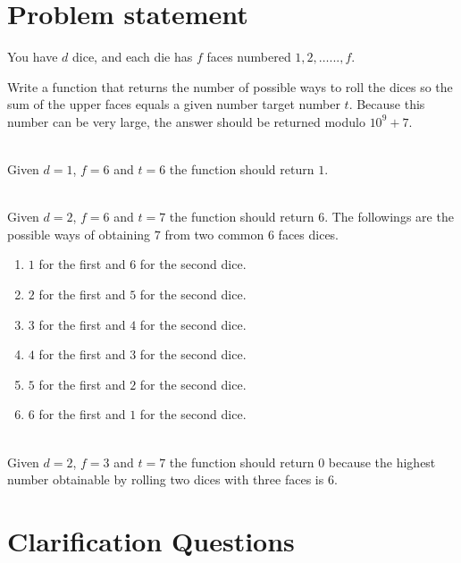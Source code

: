\section{Problem statement}
\begin{exercise}
You have $d$ dice, and each die has $f$ faces numbered $1, 2, \ldots..., f$.

Write a function that returns the number of possible ways to roll the dices so the sum of the upper
faces equals a given number target number $t$. Because this number can be very large, the answer
should be returned modulo $10^9 + 7$.

	\begin{example}
		\hfill \\
		Given $d=1$, $f=6$ and $t=6$ the function should return $1$.
	\end{example}

	\begin{example}
		\hfill \\
		Given $d=2$, $f=6$ and $t=7$ the function should return $6$. The followings are the possible
		ways of obtaining $7$ from two common $6$ faces dices.
		\begin{enumerate}
			\item $1$ for the first and $6$ for the second dice.
			\item $2$ for the first and $5$ for the second dice.
			\item $3$ for the first and $4$ for the second dice.
			\item $4$  for the first and $3$ for the second dice.
			\item $5$  for the first and $2$ for the second dice.
			\item $6$  for the first and $1$ for the second dice.
		\end{enumerate}
	\end{example}

	\begin{example}
		\hfill \\
		Given $d=2$, $f=3$ and $t=7$ the function should return $0$ because the highest number
		obtainable by rolling two dices with three faces is $6$.
	\end{example}
\end{exercise}

\section{Clarification Questions}

